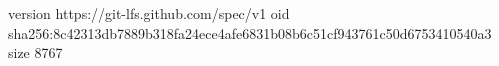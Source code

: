version https://git-lfs.github.com/spec/v1
oid sha256:8c42313db7889b318fa24ece4afe6831b08b6c51cf943761c50d6753410540a3
size 8767
